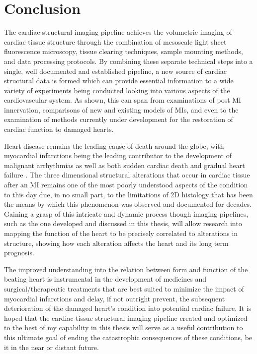 \newpage
\section{Conclusion}

The cardiac structural imaging pipeline achieves the volumetric imaging of cardiac tissue structure through the combination of mesoscale light sheet fluorescence microscopy, tissue clearing techniques, sample mounting methods, and data processing protocols. By combining these separate technical steps into a single, well documented and established pipeline, a new source of cardiac structural data is formed which can provide essential information to a wide variety of experiments being conducted looking into various aspects of the cardiovascular system. As shown, this can span from examinations of post MI innervation, comparisons of new and existing models of MIs, and even to the examination of methods currently under development for the restoration of cardiac function to damaged hearts.

Heart disease remains the leading cause of death around the globe, with myocardial infarctions being the leading contributor to the development of malignant arrhythmias as well as both sudden cardiac death and gradual heart failure \cite{golla_heart_2025}. The three dimensional structural alterations that occur in cardiac tissue after an MI remains one of the most poorly understood aspects of the condition to this day due, in no small part, to the limitations of 2D histology that has been the means by which this phenomenon was observed and documented for decades. Gaining a grasp of this intricate and dynamic process though imaging pipelines, such as the one developed and discussed in this thesis, will allow research into mapping the function of the heart to be precisely correlated to alterations in structure, showing how each alteration affects the heart and its long term prognosis. 

The improved understanding into the relation between form and function of the beating heart is instrumental in the development of medicines and surgical/therapeutic treatments that are best suited to minimize the impact of myocardial infarctions and delay, if not outright prevent, the subsequent deterioration of the damaged heart's condition into potential cardiac failure. It is hoped that the cardiac tissue structural imaging pipeline created and optimized to the best of my capability in this thesis will serve as a useful contribution to this ultimate goal of ending the catastrophic consequences of these conditions, be it in the near or distant future.



